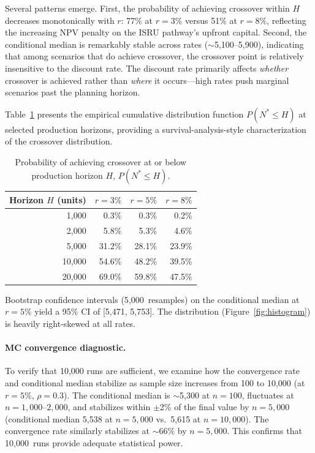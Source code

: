 \documentclass[preprint,12pt]{elsarticle}
\begin{document}
Several patterns emerge. First, the probability of achieving crossover within $H$ decreases monotonically with $r$: 77\% at $r = 3\%$ versus 51\% at $r = 8\%$, reflecting the increasing NPV penalty on the ISRU pathway's upfront capital. Second, the conditional median is remarkably stable across rates ($\sim$5{,}100--5{,}900), indicating that among scenarios that do achieve crossover, the crossover point is relatively insensitive to the discount rate. The discount rate primarily affects \emph{whether} crossover is achieved rather than \emph{where} it occurs---high rates push marginal scenarios past the planning horizon.

Table~\ref{tab:convergence} presents the empirical cumulative distribution function $P(N^* \leq H)$ at selected production horizons, providing a survival-analysis-style characterization of the crossover distribution.

\begin{table}[htbp]
\centering
\caption{Probability of achieving crossover at or below production horizon $H$, $P(N^* \leq H)$.}
\label{tab:convergence}
\small
\begin{tabular}{@{}rrrr@{}}
\toprule
Horizon $H$ (units) & $r = 3\%$ & $r = 5\%$ & $r = 8\%$ \\
\midrule
1{,}000  & 0.3\% & 0.3\% & 0.2\% \\
2{,}000  & 5.8\% & 5.3\% & 4.6\% \\
5{,}000  & 31.2\% & 28.1\% & 23.9\% \\
10{,}000 & 54.6\% & 48.2\% & 39.5\% \\
20{,}000 & 69.0\% & 59.8\% & 47.5\% \\
\bottomrule
\end{tabular}
\end{table}

Bootstrap confidence intervals (5{,}000~resamples) on the conditional median at $r = 5\%$ yield a 95\% CI of [5{,}471, 5{,}753]. The distribution (Figure~\ref{fig:histogram}) is heavily right-skewed at all rates.

\paragraph{MC convergence diagnostic.} To verify that 10{,}000 runs are sufficient, we examine how the convergence rate and conditional median stabilize as sample size increases from 100 to 10{,}000 (at $r = 5\%$, $\rho = 0.3$). The conditional median is $\sim$5{,}300 at $n = 100$, fluctuates at $n = 1{,}000$--$2{,}000$, and stabilizes within $\pm$2\% of the final value by $n = 5{,}000$ (conditional median 5{,}538 at $n = 5{,}000$ vs.\ 5{,}615 at $n = 10{,}000$). The convergence rate similarly stabilizes at $\sim$66\% by $n = 5{,}000$. This confirms that 10{,}000~runs provide adequate statistical power.
\end{document}
